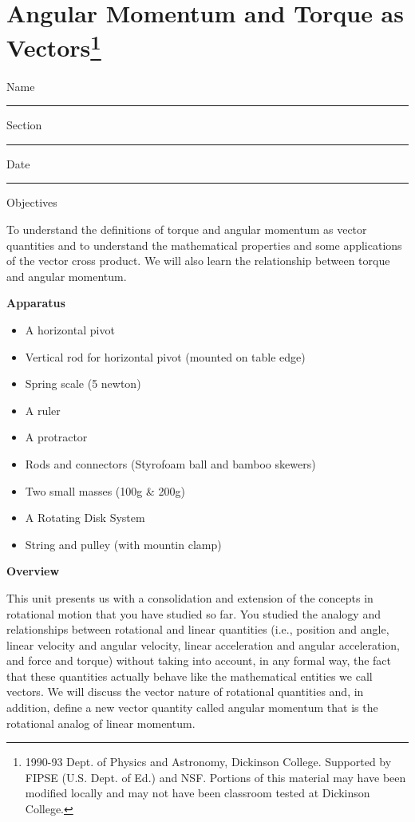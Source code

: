 \def\bmath#1{\mbox{\boldmath$#1$}} 


\section{Angular Momentum and Torque as Vectors\footnote{
1990-93 Dept. of Physics and Astronomy, Dickinson College. Supported by FIPSE
(U.S. Dept. of Ed.) and NSF. Portions of this material may have been modified
locally and may not have been classroom tested at Dickinson College.
}}

Name \rule{2.0in}{0.1pt}\hfill{}Section \rule{1.0in}{0.1pt}\hfill{}Date \rule{1.0in}{0.1pt}

Objectives 

To understand the definitions of torque and angular momentum as vector quantities
and to understand the mathematical properties and some applications of the vector
cross product. We will also learn the relationship between torque and angular
momentum.

\textbf{Apparatus}

\begin{itemize}
\item A horizontal pivot
\item Vertical rod for horizontal pivot (mounted on table edge)
\item Spring scale (5 newton)
\item A ruler 
\item A protractor 
\item Rods and connectors (Styrofoam ball and bamboo skewers)
\item Two small masses (100g \& 200g) 
\item A Rotating Disk System 
\item String and pulley (with mountin clamp)
\end{itemize}
\textbf{Overview} 

This unit presents us with a consolidation and extension of the concepts in
rotational motion that you have studied so far. You studied the analogy and
relationships between rotational and linear quantities (i.e., position and angle,
linear velocity and angular velocity, linear acceleration and angular acceleration,
and force and torque) without taking into account, in any formal way, the fact
that these quantities actually behave like the mathematical entities we call
vectors. We will discuss the vector nature of rotational quantities and, in
addition, define a new vector quantity called angular momentum that is the rotational
analog of linear momentum. 

